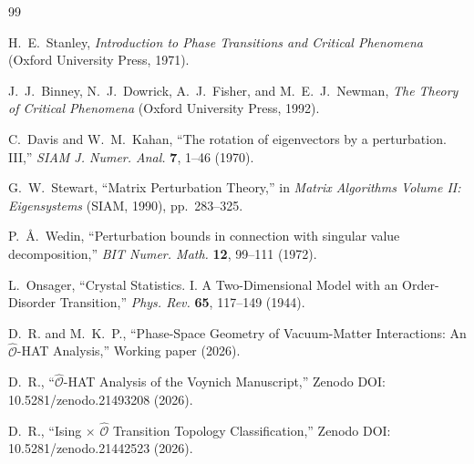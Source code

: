 \documentclass[aps,prl,twocolumn,superscriptaddress,byrevtex]{article}
\begin{document}
\begin{thebibliography}{99}

H.~E.~Stanley, \emph{Introduction to Phase Transitions and Critical Phenomena} (Oxford University Press, 1971).

J.~J.~Binney, N.~J.~Dowrick, A.~J.~Fisher, and M.~E.~J.~Newman, \emph{The Theory of Critical Phenomena} (Oxford University Press, 1992).

C.~Davis and W.~M.~Kahan, ``The rotation of eigenvectors by a perturbation. III,'' \emph{SIAM J. Numer. Anal.} \textbf{7}, 1--46 (1970).

G.~W.~Stewart, ``Matrix Perturbation Theory,'' in \emph{Matrix Algorithms Volume II: Eigensystems} (SIAM, 1990), pp.~283--325.

P.~{\AA}.~Wedin, ``Perturbation bounds in connection with singular value decomposition,'' \emph{BIT Numer. Math.} \textbf{12}, 99--111 (1972).

L.~Onsager, ``Crystal Statistics. I. A Two-Dimensional Model with an Order-Disorder Transition,'' \emph{Phys. Rev.} \textbf{65}, 117--149 (1944).

D.~R. and M.~K.~P., ``Phase-Space Geometry of Vacuum-Matter Interactions: An $\hat{\mathcal{O}}$-HAT Analysis,'' Working paper (2026).

D.~R., ``$\hat{\mathcal{O}}$-HAT Analysis of the Voynich Manuscript,'' Zenodo DOI: 10.5281/zenodo.21493208 (2026).

D.~R., ``Ising $\times$ $\hat{\mathcal{O}}$ Transition Topology Classification,'' Zenodo DOI: 10.5281/zenodo.21442523 (2026).

\end{thebibliography}
\end{document}
